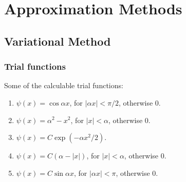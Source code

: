 \documentclass[letterpaper,10pt,english]{sphinxmanual}
\begin{document}
\section{Approximation Methods}
\label{approx::doc}\label{approx:approximation-methods}

\subsection{Variational Method}
\label{approx:variational-method}

\subsubsection{Trial functions}
\label{approx:trial-functions}
Some of the calculable trial functions:
\begin{enumerate}
\item {} 
$\psi(x) = \cos\alpha x$, for $|\alpha x|<\pi/2$, otherwise 0.

\item {} 
$\psi(x) = \alpha^2 - x^2$, for $|x|<\alpha$, otherwise 0.

\item {} 
$\psi(x) = C \exp(-\alpha x^2/2)$.

\item {} 
$\psi(x) = C(\alpha - |x|)$, for $|x|<\alpha$, otherwise 0.

\item {} 
$\psi(x) = C\sin\alpha x$, for $|\alpha x|<\pi$, otherwise 0.

\end{enumerate}
\end{document}
